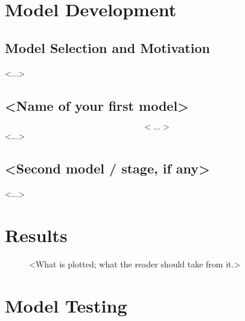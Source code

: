 \documentclass[12pt]{article}            %
\theoremstyle{definition}
\theoremstyle{remark}
\begin{document}
\section{Model Development}
\subsection{Model Selection and Motivation}
<...>

\subsection{<Name of your first model>}
\begin{equation}
  \label{eq:main}
  <...>
\end{equation}
<...>

\subsection{<Second model / stage, if any>}
<...>

\section{Results}
\begin{figure}[H]
  \centering
  \caption{<What is plotted; what the reader should take from it.>}
  \label{fig:result1}
\end{figure}

\section{Model Testing}
\end{document}

